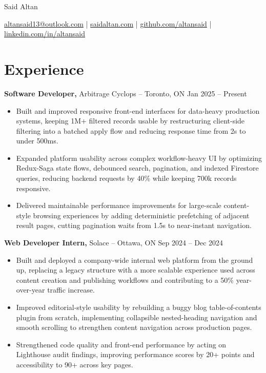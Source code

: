 \documentclass[11pt]{article}       %
\begin{document}
\centerline{\Huge Said Altan}

\vspace{10pt}

\centerline{\href{mailto:altansaid13@outlook.com}{altansaid13@outlook.com} | \href{https://saidaltan.com}{saidaltan.com} | \href{https://github.com/altansaid}{github.com/altansaid} | \href{https://www.linkedin.com/in/altansaid}{linkedin.com/in/altansaid}}


\vspace{5pt}
\section*{Experience}
\textbf{Software Developer,} {Arbitrage Cyclops} -- Toronto, ON \hfill Jan 2025 -- Present \\
\vspace{-9pt}
\begin{itemize}
  \item Built and improved responsive front-end interfaces for data-heavy production systems, keeping 1M+ filtered records usable by restructuring client-side filtering into a batched apply flow and reducing response time from 2s to under 500ms.
  \item Expanded platform usability across complex workflow-heavy UI by optimizing Redux-Saga state flows, debounced search, pagination, and indexed Firestore queries, reducing backend requests by 40\% while keeping 700k records responsive.
  \item Delivered maintainable performance improvements for large-scale content-style browsing experiences by adding deterministic prefetching of adjacent result pages, cutting pagination waits from 1.5s to near-instant navigation.
\end{itemize}

\textbf{Web Developer Intern,} {Solace} -- Ottawa, ON \hfill Sep 2024 -- Dec 2024 \\
\vspace{-9pt}
\begin{itemize}
  \item Built and deployed a company-wide internal web platform from the ground up, replacing a legacy structure with a more scalable experience used across content creation and publishing workflows and contributing to a 50\% year-over-year traffic increase.
  \item Improved editorial-style usability by rebuilding a buggy blog table-of-contents plugin from scratch, implementing collapsible nested-heading navigation and smooth scrolling to strengthen content navigation across production pages.
  \item Strengthened code quality and front-end performance by acting on Lighthouse audit findings, improving performance scores by 20+ points and accessibility to 90+ across key pages.
\end{itemize}
\end{document}
